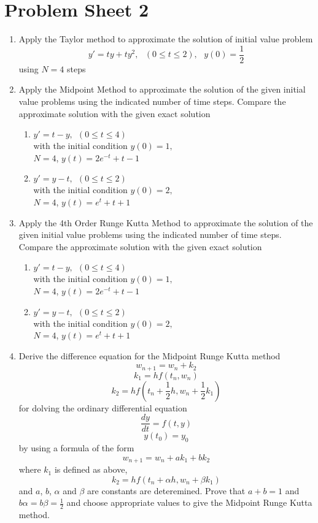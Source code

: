 \section{Problem Sheet 2}
\begin{enumerate}
\item
Apply the Taylor method to approximate the solution of initial value problem
\[ y'=ty+ty^2, \ \ \ (0\leq t \leq 2), \ \ \ y(0)=\frac{1}{2} \]
using $N=4$ steps

\item
Apply the Midpoint Method to approximate the solution of the given initial value problems using the indicated number of time steps. Compare the approximate solution with the given exact solution
\begin{enumerate}
\item
$y'=t-y, \ \ (0\leq t \leq 4)$\\
with the initial condition $y(0)=1,$\\
$N=4$, 
$y(t)=2e^{-t}+t-1$\\

\item 
$y'=y-t, \ \ (0\leq t \leq 2)$\\
with the initial condition $y(0)=2,$\\
$N=4$, 
$y(t)=e^{t}+t+1$\\

\end{enumerate}
\item
Apply the 4th Order Runge Kutta Method to approximate the solution of the given initial value problems using the indicated number of time steps. Compare the approximate solution with the given exact solution
\begin{enumerate}
\item
$y'=t-y, \ \ (0\leq t \leq 4)$\\
with the initial condition $y(0)=1,$\\
$N=4$, 
$y(t)=2e^{-t}+t-1$\\

\item 
$y'=y-t, \ \ (0\leq t \leq 2)$\\
with the initial condition $y(0)=2,$\\
$N=4$, 
$y(t)=e^{t}+t+1$\\

\end{enumerate}
\item
Derive the difference equation for the Midpoint Runge Kutta method\\
\[ w_{n+1}=w_n+k_2\]
\[k_1=hf(t_n,w_n)\]
\[k_2=hf(t_n+\frac{1}{2}h,w_n+\frac{1}{2}k_1)\]
for dolving the ordinary differential equation
\[ \frac{dy}{dt}=f(t,y) \]
\[y(t_0)=y_0 \]
by using a formula of the form
\[w_{n+1}=w_n+ak_1+bk_2 \]
where $k_1$ is defined as above,
\[k_2=hf(t_n+\alpha h,w_n+\beta k_1)\]
and $a$, $b$, $\alpha$ and $\beta$ are constants are deteremined. Prove that $a+b=1$ and $b\alpha=b\beta=\frac{1}{2}$ and choose appropriate values to give the Midpoint Runge Kutta method.


\end{enumerate}
\newpage